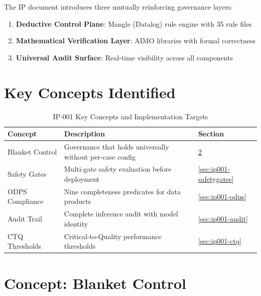 The IP document introduces three mutually reinforcing governance layers:
\begin{enumerate}[nosep]
    \item \textbf{Deductive Control Plane}: Mangle (Datalog) rule engine with 35 rule files
    \item \textbf{Mathematical Verification Layer}: AIMO libraries with formal correctness
    \item \textbf{Universal Audit Surface}: Real-time visibility across all components
\end{enumerate}

\section{Key Concepts Identified}

\begin{table}[H]
\centering
\caption{IP-001 Key Concepts and Implementation Targets}
\label{tab:ip001-concepts}
\begin{tabularx}{\textwidth}{@{}p{3.5cm}Xl@{}}
\toprule
\textbf{Concept} & \textbf{Description} & \textbf{Section} \\
\midrule
Blanket Control & Governance that holds universally without per-case config & \ref{sec:ip001-blanket} \\
Safety Gates & Multi-gate safety evaluation before deployment & \ref{sec:ip001-safetygates} \\
ODPS Compliance & Nine completeness predicates for data products & \ref{sec:ip001-odps} \\
Audit Trail & Complete inference audit with model identity & \ref{sec:ip001-audit} \\
CTQ Thresholds & Critical-to-Quality performance thresholds & \ref{sec:ip001-ctq} \\
\bottomrule
\end{tabularx}
\end{table}

\section{Concept: Blanket Control}
\label{sec:ip001-blanket}

